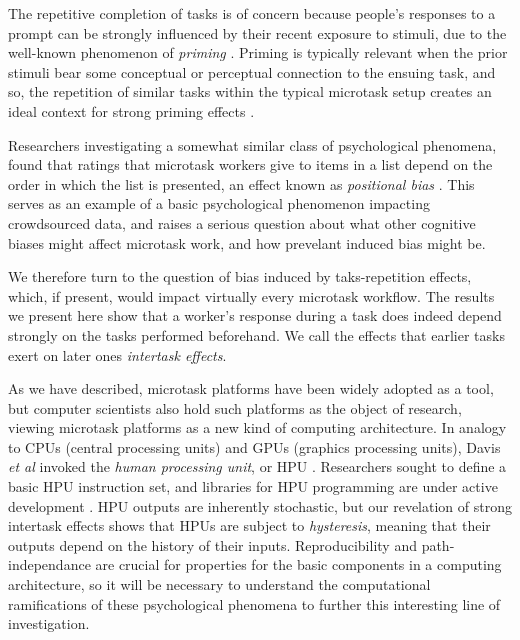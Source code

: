 \documentclass[12pt]{article}
\begin{document}
The repetitive completion of tasks is of concern because people's responses
to a prompt can be strongly influenced by their recent exposure to stimuli,
due to the well-known phenomenon of \textit{priming} 
\cite{BJOP1796,No2007,beller1971priming}.  Priming is typically relevant when 
the prior stimuli bear some conceptual or perceptual connection to the 
ensuing task, and so, the repetition of similar tasks within the typical 
microtask setup creates an ideal context for strong priming effects
\cite{Gass1999549,sohn2001task}.

Researchers investigating a somewhat similar class of psychological phenomena,
found that ratings that microtask workers give to items in a list
depend on the order in which the list is presented, an effect known as
\textit{positional bias} \cite{lerman2014leveraging}.  This serves as an 
example of a basic psychological phenomenon impacting crowdsourced data,
and raises a serious question about what other cognitive biases might
affect microtask work, and how prevelant induced bias might be.  

We therefore turn to the question of bias induced by taks-repetition effects, 
which, if present, would impact virtually every microtask workflow.
The results we present here show that a worker's response during a task
does indeed depend strongly on the tasks performed beforehand.   
We call the effects that earlier tasks exert on later ones 
\textit{intertask effects}.

As we have described, microtask platforms have been widely adopted as a 
tool, but computer scientists also hold such platforms as the object of 
research, viewing  microtask platforms as a new kind of computing 
architecture.  In analogy to CPUs (central 
processing units) and GPUs (graphics processing units), 
Davis \textit{et al} invoked the \textit{human processing unit}, or HPU \cite{5543192}.
Researchers sought to define a basic HPU instruction set, and
libraries for HPU programming are under active development
 \cite{little2010turkit,minder2011crowdlang,minder2012crowdlang,kittur2011crowdforge}.  
HPU outputs are inherently stochastic, but our revelation of strong intertask 
effects shows that HPUs are subject to \textit{hysteresis}, 
meaning that their 
outputs depend on the history of their inputs.  Reproducibility and 
path-independance are crucial for properties for the basic components in a 
computing architecture, so it will be necessary to understand the 
computational ramifications of these psychological phenomena to further this 
interesting line of investigation.
\end{document}
